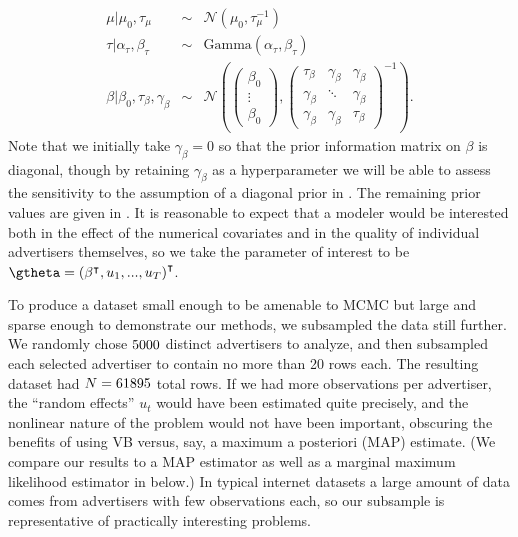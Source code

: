 \documentclass{article}\usepackage[]{graphicx}\usepackage[]{color}
\theoremstyle{plain}
\theoremstyle{definition}
\theoremstyle{plain}
\theoremstyle{plain}
\theoremstyle{plain}
\theoremstyle{plain}
\begin{document}
\begin{eqnarray*}
\mu\vert\mu_{0},\tau_{\mu} & \sim & \mathcal{N}\left(\mu_{0},\tau_{\mu}^{-1}\right)\\
\tau\vert\alpha_{\tau},\beta_{\tau} & \sim & \textrm{Gamma}\left(\alpha_{\tau},\beta_{\tau}\right)\\
\beta\vert\beta_{0},\tau_{\beta},\gamma_{\beta} & \sim & \mathcal{N}\left(\left(\begin{array}{c}
\beta_{0}\\
\vdots\\
\beta_{0}
\end{array}\right),\left(\begin{array}{ccc}
\tau_{\beta} & \gamma_{\beta} & \gamma_{\beta}\\
\gamma_{\beta} & \ddots & \gamma_{\beta}\\
\gamma_{\beta} & \gamma_{\beta} & \tau_{\beta}
\end{array}\right)^{-1}\right).
\end{eqnarray*}
Note that we initially take $\gamma_{\beta}=0$ so that the prior
information matrix on $\beta$ is diagonal, though by retaining $\gamma_{\beta}$
as a hyperparameter we will be able to assess the sensitivity to the
assumption of a diagonal prior in .
The remaining prior values are given in .
It is reasonable to expect that a modeler would be interested both
in the effect of the numerical covariates and in the quality of individual
advertisers themselves, so we take the parameter of interest to be
$\gtheta=\left(\beta^{\trans},u_{1},...,u_{T}\right)^{\trans}$. 

To produce a dataset small enough to be amenable to MCMC but large
and sparse enough to demonstrate our methods, we subsampled the data
still further. We randomly chose $5000$ distinct advertisers
to analyze, and then subsampled each selected advertiser to contain
no more than 20 rows each. The resulting dataset had $N=61895$
total rows. If we had more observations per advertiser, the ``random
effects'' $u_{t}$ would have been estimated quite precisely, and
the nonlinear nature of the problem would not have been important,
obscuring the benefits of using VB versus, say, a maximum a posteriori
(MAP) estimate. (We compare our results to a MAP estimator as well
as a marginal maximum likelihood estimator in 
below.) In typical internet datasets a large amount of data comes
from advertisers with few observations each, so our subsample is representative
of practically interesting problems. 
\end{document}
